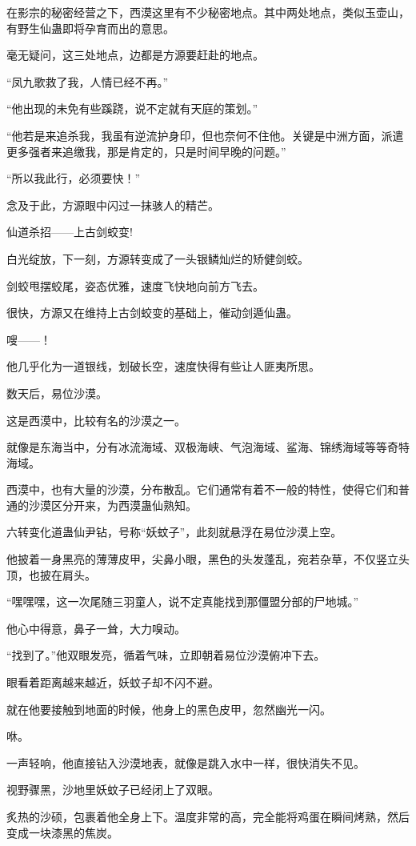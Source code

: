 \begin{this_body}
在影宗的秘密经营之下，西漠这里有不少秘密地点。其中两处地点，类似玉壶山，有野生仙蛊即将孕育而出的意思。

毫无疑问，这三处地点，边都是方源要赶赴的地点。

“凤九歌救了我，人情已经不再。”

“他出现的未免有些蹊跷，说不定就有天庭的策划。”

“他若是来追杀我，我虽有逆流护身印，但也奈何不住他。关键是中洲方面，派遣更多强者来追缴我，那是肯定的，只是时间早晚的问题。”

“所以我此行，必须要快！”

念及于此，方源眼中闪过一抹骇人的精芒。

仙道杀招——上古剑蛟变!

白光绽放，下一刻，方源转变成了一头银鳞灿烂的矫健剑蛟。

剑蛟甩摆蛟尾，姿态优雅，速度飞快地向前方飞去。

很快，方源又在维持上古剑蛟变的基础上，催动剑遁仙蛊。

嗖——！

他几乎化为一道银线，划破长空，速度快得有些让人匪夷所思。

数天后，易位沙漠。

这是西漠中，比较有名的沙漠之一。

就像是东海当中，分有冰流海域、双极海峡、气泡海域、鲨海、锦绣海域等等奇特海域。

西漠中，也有大量的沙漠，分布散乱。它们通常有着不一般的特性，使得它们和普通的沙漠区分开来，为西漠蛊仙熟知。

六转变化道蛊仙尹钻，号称“妖蚊子”，此刻就悬浮在易位沙漠上空。

他披着一身黑亮的薄薄皮甲，尖鼻小眼，黑色的头发蓬乱，宛若杂草，不仅竖立头顶，也披在肩头。

“嘿嘿嘿，这一次尾随三羽童人，说不定真能找到那僵盟分部的尸地城。”

他心中得意，鼻子一耸，大力嗅动。

“找到了。”他双眼发亮，循着气味，立即朝着易位沙漠俯冲下去。

眼看着距离越来越近，妖蚊子却不闪不避。

就在他要接触到地面的时候，他身上的黑色皮甲，忽然幽光一闪。

咻。

一声轻响，他直接钻入沙漠地表，就像是跳入水中一样，很快消失不见。

视野骤黑，沙地里妖蚊子已经闭上了双眼。

炙热的沙硕，包裹着他全身上下。温度非常的高，完全能将鸡蛋在瞬间烤熟，然后变成一块漆黑的焦炭。


\end{this_body}
